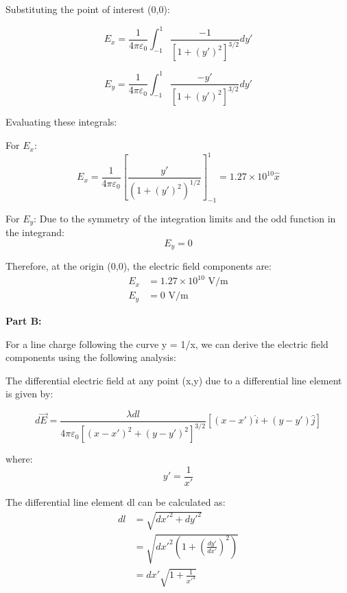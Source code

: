 \documentclass[14pt]{article}
\begin{document}
Substituting the point of interest (0,0):

\begin{equation}
E_x = \frac{1}{4\pi\varepsilon_0} \int_{-1}^{1} \frac{-1}{[1 + (y')^2]^{3/2}} dy'
\end{equation}

\begin{equation}
E_y = \frac{1}{4\pi\varepsilon_0} \int_{-1}^{1} \frac{-y'}{[1 + (y')^2]^{3/2}} dy'
\end{equation}

Evaluating these integrals:

For \(E_x\):
\begin{equation}
E_x = \frac{1}{4\pi\varepsilon_0} \left[\frac{y'}{(1 + (y')^2)^{1/2}}\right]_{-1}^{1} = 1.27 \times 10^{10} \hat{x}
\end{equation}

For \(E_y\):
Due to the symmetry of the integration limits and the odd function in the integrand:
\begin{equation}
E_y = 0
\end{equation}

Therefore, at the origin (0,0), the electric field components are:
\begin{align}
E_x &= 1.27 \times 10^{10} \text{ V/m} \\
E_y &= 0 \text{ V/m}
\end{align}

\noindent\textbf{Part B:}

For a line charge following the curve y = 1/x, we can derive the electric field components using the following analysis:

The differential electric field at any point (x,y) due to a differential line element is given by:

\begin{equation}
d\vec{E} = \frac{\lambda dl}{4\pi\varepsilon_0[(x-x')^2 + (y-y')^2]^{3/2}}[(x-x')\hat{i} + (y-y')\hat{j}]
\end{equation}

where:
\begin{equation}
y' = \frac{1}{x'}
\end{equation}

The differential line element dl can be calculated as:
\begin{align}
dl &= \sqrt{dx'^2 + dy'^2} \\
   &= \sqrt{dx'^2(1 + (\frac{dy'}{dx'})^2)} \\
   &= dx'\sqrt{1 + \frac{1}{x'^4}}
\end{align}
\end{document}

